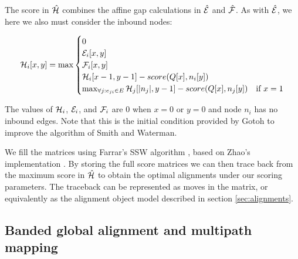 The score in $\hat{\cal H}$ combines the affine gap calculations in $\hat{\cal E}$ and $\hat{\cal F}$.
As with $\hat{\cal E}$, we here we also must consider the inbound nodes:

\begin{equation}
  \label{eqn:gssw_h}
  {\cal H}_i[x,y] = \max
  \begin{cases}
    0 \\
    {\cal E}_i[x,y] \\
    {\cal F}_i[x,y] \\
    {\cal H}_i[x-1,y-1] - score(Q[x], n_i[y])\\
    \max_{\forall j : e_{ji} \in E} {\cal H}_j[|n_j|,y-1] - score(Q[x], n_j[y]) & \text{if } x = 1 \\
  \end{cases}
\end{equation}

The values of ${\cal H}_i$, ${\cal E}_i$, and ${\cal F}_i$ are 0 when $x = 0$ or $y = 0$ and node $n_i$ has no inbound edges.
Note that this is the initial condition provided by Gotoh to improve the algorithm of Smith and Waterman.

We fill the matrices using Farrar's SSW algorithm \cite{farrar2007striped}, based on Zhao's implementation \cite{zhao2013ssw}.
By storing the full score matrices we can then trace back from the maximum score in $\hat{\cal H}$ to obtain the optimal alignments under our scoring parameters.
The traceback can be represented as moves in the matrix, or equivalently as the alignment object model described in section \ref{sec:alignments}.

\subsection{Banded global alignment and multipath mapping}
\label{sec:banded_global}

